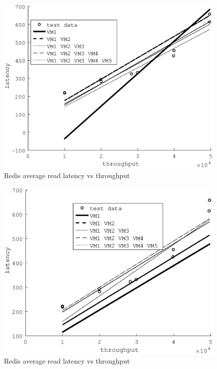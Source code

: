 \documentclass{acm_proc_article-sp}
\begin{document}
\begin{figure}
\centering
\includegraphics[scale = 0.5]{fit_read_avg_latency_r3__r3_2x_m3_2x_m3__m3_x_r3_x.eps}
\caption{Redis average read latency vs throughput}
\label{figure:redisbarread}
\end{figure}

\begin{figure}
\centering
\includegraphics[scale = 0.5]{fit_read_avg_latency_r3_2x_r3_x_m3_2x_m3_x_r3__m3_.eps}
\caption{Redis average read latency vs throughput}
\label{figure:redisbarread}
\end{figure}
\end{document}
